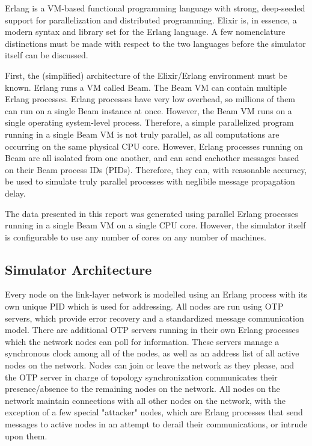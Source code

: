 \documentclass[12pt]{article}
\begin{document}
Erlang is a VM-based functional programming language with strong, deep-seeded support for parallelization and distributed programming. Elixir is, in essence, a modern syntax and library set for the Erlang language. A few nomenclature distinctions must be made with respect to the two languages before the simulator itself can be discussed.

First, the (simplified) architecture of the Elixir/Erlang environment must be known. Erlang runs a VM called Beam. The Beam VM can contain multiple Erlang processes. Erlang processes have very low overhead, so millions of them can run on a single Beam instance at once. However, the Beam VM runs on a single operating system-level process. Therefore, a simple parallelized program running in a single Beam VM is not truly parallel, as all computations are occurring on the same physical CPU core. However, Erlang processes running on Beam are all isolated from one another, and can send eachother messages based on their Beam process IDs (PIDs). Therefore, they can, with reasonable accuracy, be used to simulate truly parallel processes with neglibile message propagation delay.

The data presented in this report was generated using parallel Erlang processes running in a single Beam VM on a single CPU core. However, the simulator itself is configurable to use any number of cores on any number of machines.

\subsection{Simulator Architecture}

Every node on the link-layer network is modelled using an Erlang process with its own unique PID which is used for addressing. All nodes are run using OTP servers, which provide error recovery and a standardized message communication model. There are additional OTP servers running in their own Erlang processes which the network nodes can poll for information. These servers manage a synchronous clock among all of the nodes, as well as an address list of all active nodes on the network. Nodes can join or leave the network as they please, and the OTP server in charge of topology synchronization communicates their presence/absence to the remaining nodes on the network. All nodes on the network maintain connections with all other nodes on the network, with the exception of a few special "attacker" nodes, which are Erlang processes that send messages to active nodes in an attempt to derail their communications, or intrude upon them. 
\end{document}
